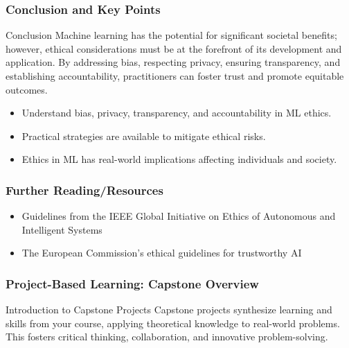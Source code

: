 \documentclass[aspectratio=169]{beamer}
\begin{document}
\begin{frame}[fragile]
    \frametitle{Conclusion and Key Points}
    \begin{block}{Conclusion}
    Machine learning has the potential for significant societal benefits; however, ethical considerations must be at the forefront of its development and application. By addressing bias, respecting privacy, ensuring transparency, and establishing accountability, practitioners can foster trust and promote equitable outcomes.
    \end{block}

    \begin{itemize}
        \item Understand bias, privacy, transparency, and accountability in ML ethics.
        \item Practical strategies are available to mitigate ethical risks.
        \item Ethics in ML has real-world implications affecting individuals and society.
    \end{itemize}
\end{frame}

\begin{frame}[fragile]
    \frametitle{Further Reading/Resources}
    \begin{itemize}
        \item Guidelines from the IEEE Global Initiative on Ethics of Autonomous and Intelligent Systems
        \item The European Commission's ethical guidelines for trustworthy AI
    \end{itemize}
\end{frame}

\begin{frame}[fragile]
\frametitle{Project-Based Learning: Capstone Overview}

\begin{block}{Introduction to Capstone Projects}
Capstone projects synthesize learning and skills from your course, applying theoretical knowledge to real-world problems. This fosters critical thinking, collaboration, and innovative problem-solving.
\end{block}
\end{frame}
\end{document}

